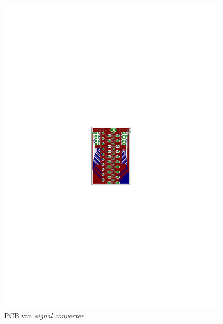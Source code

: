\begin{figure}
    \includegraphics[scale=.75]{appendix/SignaalConverter_pcb.pdf}
    \caption{PCB van \emph{signal converter}}
\end{figure}

